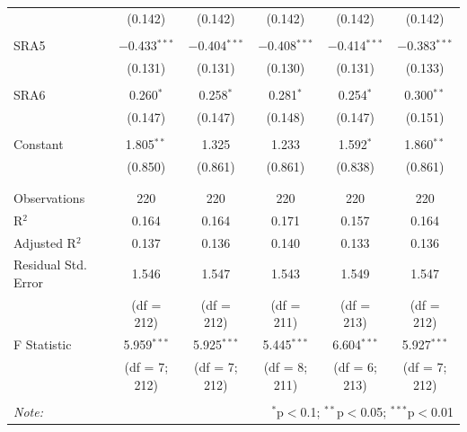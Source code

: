 \documentclass[12pt]{article}
\begin{document}
\begin{table}[!htbp]
\begin{adjustbox}{width=\textwidth}
\begin{tabular}{@{\extracolsep{5pt}}lccccc}
  & (0.142) & (0.142) & (0.142) & (0.142) & (0.142) \\ 
  & & & & & \\ 
 SRA5 & $-$0.433$^{***}$ & $-$0.404$^{***}$ & $-$0.408$^{***}$ & $-$0.414$^{***}$ & $-$0.383$^{***}$ \\ 
  & (0.131) & (0.131) & (0.130) & (0.131) & (0.133) \\ 
  & & & & & \\ 
 SRA6 & 0.260$^{*}$ & 0.258$^{*}$ & 0.281$^{*}$ & 0.254$^{*}$ & 0.300$^{**}$ \\ 
  & (0.147) & (0.147) & (0.148) & (0.147) & (0.151) \\ 
  & & & & & \\ 
 Constant & 1.805$^{**}$ & 1.325 & 1.233 & 1.592$^{*}$ & 1.860$^{**}$ \\ 
  & (0.850) & (0.861) & (0.861) & (0.838) & (0.861) \\ 
  & & & & & \\ 
\hline \\[-1.8ex] 
Observations & 220 & 220 & 220 & 220 & 220 \\ 
R$^{2}$ & 0.164 & 0.164 & 0.171 & 0.157 & 0.164 \\ 
Adjusted R$^{2}$ & 0.137 & 0.136 & 0.140 & 0.133 & 0.136 \\ 
Residual Std. Error & 1.546 & 1.547  & 1.543  & 1.549 & 1.547  \\ 
& (df = 212) &(df = 212) &(df = 211) &(df = 213) &(df = 212) \\
F Statistic & 5.959$^{***}$ & 5.925$^{***}$ & 5.445$^{***}$  & 6.604$^{***}$  & 5.927$^{***}$  \\ 
& (df = 7; 212) & (df = 7; 212) & (df = 8; 211) & (df = 6; 213) & (df = 7; 212) \\
\hline 
\hline \\[-1.8ex] 
\textit{Note:}  & \multicolumn{5}{r}{$^{*}$p$<$0.1; $^{**}$p$<$0.05; $^{***}$p$<$0.01} \\ 
\end{tabular} 
\end{adjustbox}
\end{table} 
\end{document}
